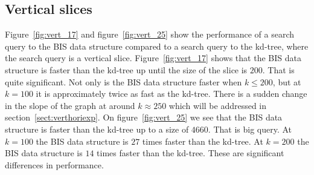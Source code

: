 \subsection{Vertical slices}

Figure~\ref{fig:vert_17} and figure~\ref{fig:vert_25} show the performance of a search query to the BIS data structure compared to a search query to the kd-tree, where the search query is a vertical slice. Figure~\ref{fig:vert_17} shows that the BIS data structure is faster than the kd-tree up until the size of the slice is $200$. That is quite significant. Not only is the BIS data structure faster when $k \leq 200$, but at $k = 100$ it is approximately twice as fast as the kd-tree. There is a sudden change in the slope of the graph at around $k \approx 250$ which will be addressed in section~\ref{sect:verthoriexp}. On figure~\ref{fig:vert_25} we see that the BIS data structure is faster than the kd-tree up to a size of $4660$. That is big query. At $k = 100$ the BIS data structure is $27$ times faster than the kd-tree. At $k = 200$ the BIS data structure is $14$ times faster than the kd-tree. These are significant differences in performance. \\


